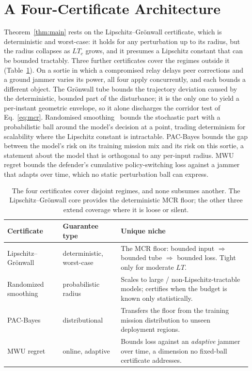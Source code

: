 \section{A Four-Certificate Architecture}
\label{sec:certs}
Theorem~\ref{thm:main} rests on the Lipschitz--Gr\"onwall certificate, which is
deterministic and worst-case: it holds for any perturbation up to its radius,
but the radius collapses as $LT_c$ grows, and it presumes a Lipschitz constant
that can be bounded tractably. Three further certificates cover the regimes
outside it (Table~\ref{tab:certs}). On a sortie in which a compromised relay
delays peer corrections and a ground jammer varies its power, all four apply
concurrently, and each bounds a different object. The Gr\"onwall tube bounds
the trajectory deviation caused by the deterministic, bounded part of the
disturbance; it is the only one to yield a per-instant geometric envelope, so it
alone discharges the corridor test of Eq.~\eqref{eq:mcr}. Randomised
smoothing~\cite{cohen2019smoothing} bounds the stochastic part with a
probabilistic ball around the model's decision at a point, trading determinism
for scalability where the Lipschitz constant is intractable. PAC-Bayes bounds
the gap between the model's risk on its training mission mix and its risk on
this sortie, a statement about the model that is orthogonal to any per-input
radius. MWU regret bounds the defender's cumulative policy-switching loss
against a jammer that adapts over time, which no static perturbation ball can
express.

\begin{table}[t]
\centering
\caption{The four certificates cover disjoint regimes, and none subsumes
another. The Lipschitz--Gr\"onwall core provides the deterministic MCR floor;
the other three extend coverage where it is loose or silent.}
\label{tab:certs}
\footnotesize
\renewcommand{\arraystretch}{1.05}
\begin{tabularx}{\columnwidth}{@{}
  >{\hsize=0.82\hsize\raggedright\arraybackslash}X
  >{\hsize=0.70\hsize\raggedright\arraybackslash}X
  >{\hsize=1.48\hsize\raggedright\arraybackslash}X@{}}
\toprule
\textbf{Certificate} & \textbf{Guarantee type} & \textbf{Unique niche}\\
\midrule
Lipschitz--Gr\"onwall & deterministic, worst-case & The MCR floor: bounded input $\Rightarrow$ bounded tube $\Rightarrow$ bounded loss. Tight only for moderate $LT$.\\
Randomized smoothing~\cite{cohen2019smoothing} & probabilistic radius & Scales to large / non-Lipschitz-tractable models; certifies when the budget is known only statistically.\\
PAC-Bayes~\cite{viallard2021pacbayes} & distributional & Transfers the floor from the training mission distribution to unseen deployment regions.\\
MWU regret~\cite{arora2012mwu,balcan2015commitment} & online, adaptive & Bounds loss against an \emph{adaptive} jammer over time, a dimension no fixed-ball certificate addresses.\\
\bottomrule
\end{tabularx}
\end{table}

